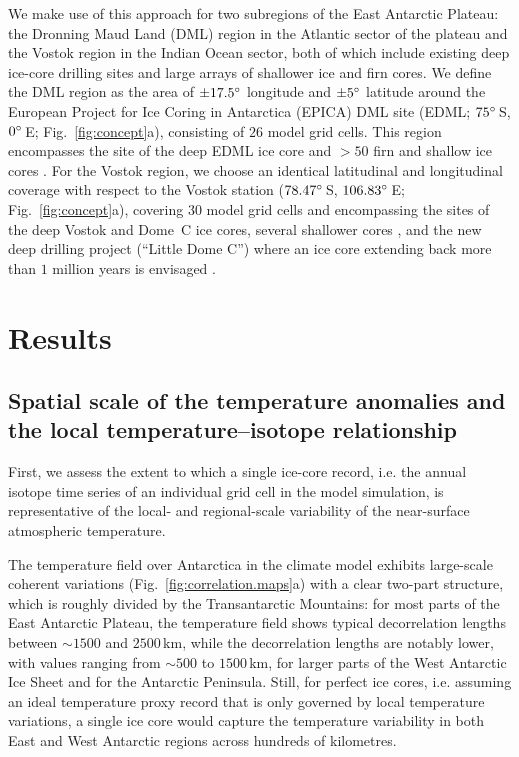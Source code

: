 \documentclass[cp]{copernicus}
\begin{document}
We make use of this approach for two subregions of the East Antarctic Plateau:
the Dronning Maud Land (DML) region in the Atlantic sector of the plateau and
the Vostok region in the Indian Ocean sector, both of which include existing
deep ice-core drilling sites and large arrays of shallower ice and firn
cores. We define the DML region as the area of $\pm17.5^{\circ}$ longitude and
$\pm5^{\circ}$ latitude around the European Project for Ice Coring in Antarctica
(EPICA) DML site (EDML; $75^{\circ}$\,S, $0^{\circ}$\,E; Fig.~\ref{fig:concept}a),
consisting of $26$ model grid cells. This region encompasses the site of the
deep EDML ice core \citep{EPICAcommunitymembers2006,awi2016} and $>50$ firn and
shallow ice cores \citep{Altnau2015}. For the Vostok region, we choose an
identical latitudinal and longitudinal coverage with respect to the Vostok
station ($78.47^{\circ}$\,S, $106.83^{\circ}$\,E; Fig.~\ref{fig:concept}a),
covering $30$ model grid cells and encompassing the sites of the deep Vostok and
Dome~C ice cores, several shallower cores \citep{Stenni2017}, and the new deep
drilling project (``Little Dome C'') where an ice core extending back more than
$1$ million years is envisaged \citep{Passalacqua2018}.

\section{Results}\label{results}

\subsection{Spatial scale of the temperature anomalies and the local
  temperature--isotope relationship}
\label{results:t2m-iso}

First, we assess the extent to which a single ice-core record, i.e. the annual
isotope time series of an individual grid cell in the model simulation, is
representative of the local- and regional-scale variability of the near-surface
atmospheric temperature.

The temperature field over Antarctica in the climate model exhibits large-scale
coherent variations (Fig.~\ref{fig:correlation.maps}a) with a clear two-part
structure, which is roughly divided by the Transantarctic Mountains: for most
parts of the East Antarctic Plateau, the temperature field shows typical
decorrelation lengths between $\sim1500$ and $2500$\,km, while the decorrelation
lengths are notably lower, with values ranging from $\sim500$ to $1500$\,km, for
larger parts of the West Antarctic Ice Sheet and for the Antarctic Peninsula.
Still, for perfect ice cores, i.e. assuming an ideal temperature proxy record
that is only governed by local temperature variations, a single ice core would
capture the temperature variability in both East and West Antarctic regions
across hundreds of kilometres.
\end{document}
